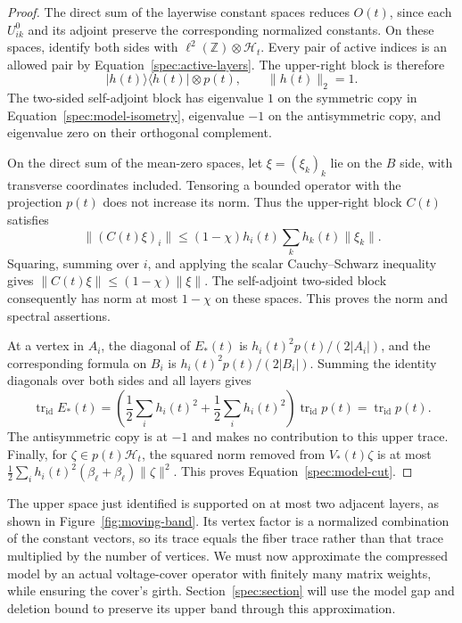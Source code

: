 \begin{proof}
The direct sum of the layerwise constant spaces reduces $O(t)$, since each
$U^0_{ik}$ and its adjoint preserve the corresponding normalized constants.
On these spaces, identify both sides with $\ell^2(\mathbb Z)\otimes
\mathcal H_t$.  Every pair of active indices is an allowed pair by
Equation~\eqref{spec:active-layers}.  The upper-right block is therefore
\[
       |h(t)\rangle\langle h(t)|\otimes p(t),
       \qquad \|h(t)\|_2=1.
\]
The two-sided self-adjoint block has eigenvalue $1$ on the symmetric copy
in Equation~\eqref{spec:model-isometry}, eigenvalue $-1$ on the
antisymmetric copy, and eigenvalue zero on their orthogonal complement.

On the direct sum of the mean-zero spaces, let $\xi=(\xi_k)_k$ lie on the
$B$ side, with transverse coordinates included.  Tensoring a bounded
operator with the projection $p(t)$ does not increase its norm.  Thus the
upper-right block $C(t)$ satisfies
\[
 \|(C(t)\xi)_i\|
 \leq (1-\chi)h_i(t)\sum_k h_k(t)\|\xi_k\|.
\]
Squaring, summing over $i$, and applying the scalar Cauchy--Schwarz
inequality gives $\|C(t)\xi\|\leq(1-\chi)\|\xi\|$.  The self-adjoint
two-sided block consequently has norm at most $1-\chi$ on these spaces.
This proves the norm and spectral assertions.

At a vertex in $A_i$, the diagonal of $E_*(t)$ is
$h_i(t)^2p(t)/(2|A_i|)$, and the corresponding formula on $B_i$ is
$h_i(t)^2p(t)/(2|B_i|)$.  Summing the identity diagonals over both sides and
all layers gives
\[
 \operatorname{tr}_{\mathrm{id}}E_*(t)
 =\left(\frac12\sum_i h_i(t)^2+\frac12\sum_i h_i(t)^2\right)
        \operatorname{tr}_{\mathrm{id}}p(t)
 =\operatorname{tr}_{\mathrm{id}}p(t).
\]
The antisymmetric copy is at $-1$ and makes no contribution to this upper
trace.  Finally, for $\zeta\in p(t)\mathcal H_t$, the squared norm removed
from $V_*(t)\zeta$ is at most
$\frac12\sum_i h_i(t)^2(\beta_\ell+\beta_\ell)\|\zeta\|^2$.
This proves Equation~\eqref{spec:model-cut}.
\end{proof}

The upper space just identified is supported on at most two adjacent
layers, as shown in Figure~\ref{fig:moving-band}. Its vertex factor is a
normalized combination of the constant vectors, so its trace equals the
fiber trace rather than that trace multiplied by the number of vertices.
We must now approximate the compressed model by an actual voltage-cover
operator with finitely many matrix weights, while ensuring the cover's
girth. Section~\ref{spec:section} will use the model gap and deletion
bound to preserve its upper band through this approximation.

